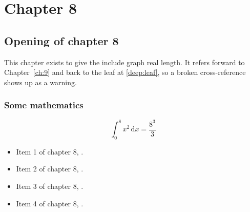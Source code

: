 \chapter{Chapter 8}
\label{ch:8}
\section{Opening of chapter 8}
This chapter exists to give the include graph real length. It refers
forward to Chapter~\ref{ch:9} and back to the leaf
at \ref{deep:leaf}, so a broken cross-reference shows up as a warning.

\subsection{Some mathematics}
\begin{equation}
  \int_0^{8} x^{2} \, \mathrm{d}x = \frac{8^{3}}{3}
\end{equation}

\begin{itemize}
  \item Item 1 of chapter 8, .
  \item Item 2 of chapter 8, .
  \item Item 3 of chapter 8, .
  \item Item 4 of chapter 8, .
\end{itemize}
